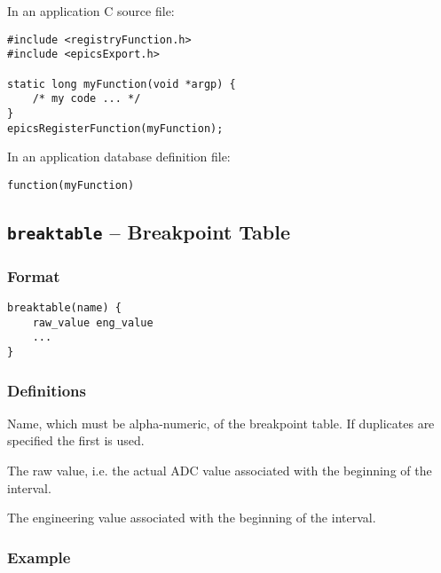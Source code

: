 In an application C source file:

\begin{verbatim}
#include <registryFunction.h>
#include <epicsExport.h>

static long myFunction(void *argp) {
    /* my code ... */
}
epicsRegisterFunction(myFunction);
\end{verbatim}

In an application database definition file:

\begin{verbatim}
function(myFunction)
\end{verbatim}

\subsection{\texttt{breaktable} -- Breakpoint Table}

\subsubsection{Format}

\begin{verbatim}
breaktable(name) {
    raw_value eng_value
    ...
}
\end{verbatim}

\subsubsection{Definitions}

\begin{description}
\item [name] Name, which must be alpha-numeric, of the breakpoint table.
If duplicates are specified the first is used.

\item [raw\_value] The raw value, i.e. the actual ADC value associated with the beginning of the interval.

\item [eng\_value] The engineering value associated with the beginning of the interval.
\end{description}

\subsubsection{Example}

